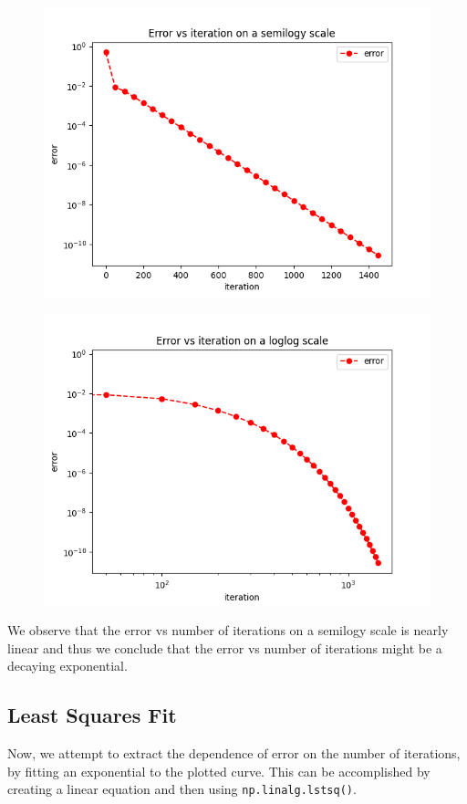 \documentclass[11pt, a4paper]{article}
\begin{document}
\begin{figure}[H]
     \centering
     \includegraphics[scale=0.8]{Figure_3.png}
\end{figure}

\begin{figure}[H]
     \centering
     \includegraphics[scale=0.8]{Figure_4.png}
\end{figure}

We observe that the error vs number of iterations on a semilogy scale is nearly linear and thus we conclude that the error vs number of iterations might be a decaying exponential.


\subsection{Least Squares Fit}
Now, we attempt to extract the dependence of error on the number of iterations, by fitting an exponential to the plotted curve. This can be accomplished by creating a linear equation and then using \texttt{np.linalg.lstsq()}. 
\end{document}
